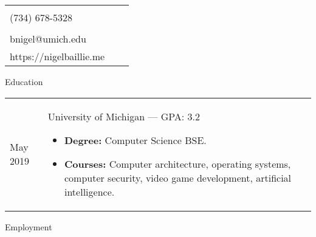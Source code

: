 \documentclass[11pt]{article}
\makeatletter
\def \address{2287 S. Main St. Ann Arbor, MI}
\def \author{Nigel Baillie}
\def \email{bnigel@umich.edu}
\def \phonenumber{(734) 678-5328}
\def \github{https://github.com/Resonious}
\def \homepage{https://nigelbaillie.me}
\renewcommand{\section}[1]{{\LARGE{#1}}\vspace{2 mm}}
\newenvironment{timeline}
        {\begin{tabular}{p{21 mm}|p{150 mm}}}
        {\end{tabular}}
\newenvironment{timelinetitle}
        {\vspace{-2 mm}\begin{large}}
        {\end{large}\vspace{-1.5 mm}}
\newcommand{\timespan}[2]{{#2}\newline{#1}}
\makeatother
\begin{document}
\newlength{\rcollength}\setlength{\rcollength}{3.0in}%
\begin{tabular} {
  p{}
  p{}
  p{}
}
  \begin{flushleft}
    {\address}\\
    {\phonenumber}
  \end{flushleft}
  &
  \begin{center}
    {\Huge{\author}}\\
    \vspace{1.5 mm}\\
    {\email}
  \end{center}
  &
  \begin{flushright}
    {\github}\\
    {\homepage}
  \end{flushright}
\end{tabular}

\section{Education}

\begin{timeline}
\timespan{Sept 2016}{May 2019}
&
\begin{timelinetitle}
  University of Michigan --- \small{GPA: 3.2}
\end{timelinetitle}
\begin{itemize}
  \item[] \textbf{Degree:} Computer Science BSE.
  \item[] \textbf{Courses:} Computer architecture, operating systems, computer security, video game development, artificial intelligence.
\end{itemize}
\end{timeline}

\vspace{3.0 mm}
\section{Employment}
\end{document}

